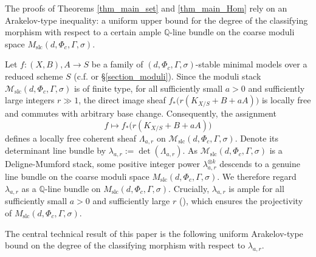 \documentclass[11pt,letterpaper]{amsart}
\numberwithin{equation}{section}
\begin{document}
	The proofs of Theorems \ref{thm_main_set} and \ref{thm_main_Hom} rely on an Arakelov-type inequality: a uniform upper bound for the degree of the classifying morphism with respect to a certain ample $\mathbb{Q}$-line bundle on the coarse moduli space $M_{\mathrm{slc}}(d,\Phi_c,\Gamma,\sigma)$.  
	
	Let $f: (X, B), A \to S$ be a family of $(d,\Phi_c,\Gamma,\sigma)$-stable minimal models over a reduced scheme $S$ (c.f. \cite{Birkar2022} or \S \ref{section_moduli}). Since the moduli stack $\mathcal{M}_{\mathrm{slc}}(d,\Phi_c,\Gamma,\sigma)$ is of finite type, for all sufficiently small $a > 0$ and sufficiently large integers $r \gg 1$, the direct image sheaf $f_*\big(r(K_{X/S} + B + aA)\big)$ is locally free and commutes with arbitrary base change. Consequently, the assignment  
	\[
	f \mapsto f_*\big(r(K_{X/S} + B + aA)\big)
	\]  
	defines a locally free coherent sheaf $\Lambda_{a,r}$ on $\mathcal{M}_{\mathrm{slc}}(d,\Phi_c,\Gamma,\sigma)$. Denote its determinant line bundle by $\lambda_{a,r} := \det(\Lambda_{a,r})$. As $\mathcal{M}_{\mathrm{slc}}(d,\Phi_c,\Gamma,\sigma)$ is a Deligne-Mumford stack, some positive integer power $\lambda_{a,r}^{\otimes k}$ descends to a genuine line bundle on the coarse moduli space $M_{\mathrm{slc}}(d,\Phi_c,\Gamma,\sigma)$. We therefore regard $\lambda_{a,r}$ as a $\mathbb{Q}$-line bundle on $M_{\mathrm{slc}}(d,\Phi_c,\Gamma,\sigma)$. Crucially, $\lambda_{a,r}$ is ample for all sufficiently small $a > 0$ and sufficiently large $r$ (\cite{Kovacs2017,Fujino2018}), which ensures the projectivity of $M_{\mathrm{slc}}(d,\Phi_c,\Gamma,\sigma)$.  
	
	The central technical result of this paper is the following uniform Arakelov-type bound on the degree of the classifying morphism with respect to $\lambda_{a,r}$.
	
\end{document}
